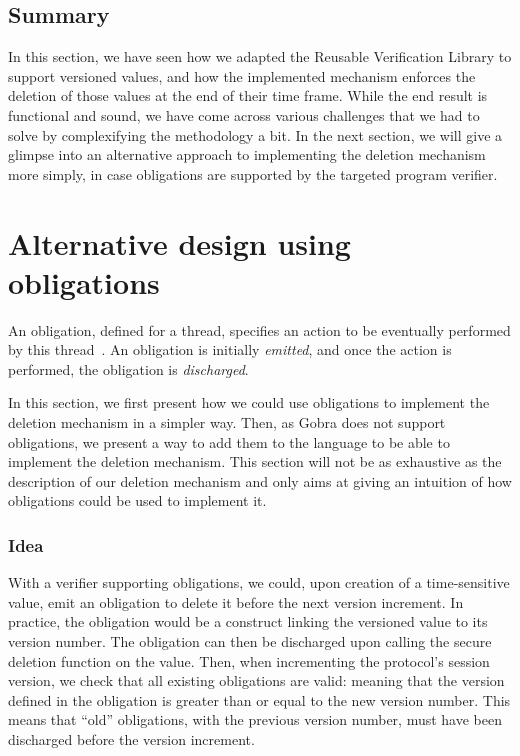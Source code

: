 \subsection*{Summary}
In this section, we have seen how we adapted the Reusable Verification Library to support versioned values, and how the implemented mechanism enforces the deletion of those values at the end of their time frame.
While the end result is functional and sound, we have come across various challenges that we had to solve by complexifying the methodology a bit.
In the next section, we will give a glimpse into an alternative approach to implementing the deletion mechanism more simply, in case obligations are supported by the targeted program verifier.

\section{Alternative design using obligations}
\label{sec:alternative-design-using-obligations}

An obligation, defined for a thread, specifies an action to be eventually performed by this thread~\cite{bostrom2014modular}. An obligation is initially \emph{emitted}, and once the action is performed, the obligation is \emph{discharged}.

In this section, we first present how we could use obligations to implement the deletion mechanism in a simpler way.
Then, as Gobra does not support obligations, we present a way to add them to the language to be able to implement the deletion mechanism.
This section will not be as exhaustive as the description of our deletion mechanism and only aims at giving an intuition of how obligations could be used to implement it.

\subsubsection{Idea}
\label{sec:obligations-idea}

With a verifier supporting obligations, we could, upon creation of a time-sensitive value, emit an obligation to delete it before the next version increment. 
In practice, the obligation would be a construct linking the versioned value to its version number.
The obligation can then be discharged upon calling the secure deletion function on the value.
Then, when incrementing the protocol's session version, we check that all existing obligations are valid: meaning that the version defined in the obligation is greater than or equal to the new version number.
This means that “old” obligations, with the previous version number, must have been discharged before the version increment.

